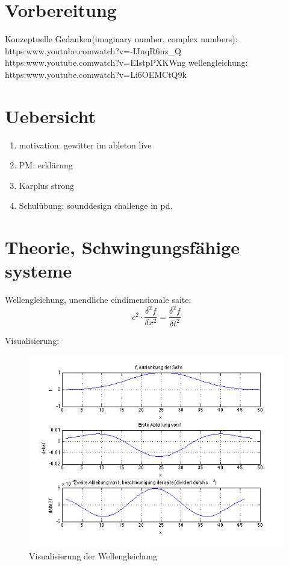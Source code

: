 \section{Vorbereitung}


Konzeptuelle Gedanken(imaginary number, complex numbers): \\
https:\/\/www.youtube.com\/watch?v=-IJuqR6nz\_Q \\
https:\/\/www.youtube.com\/watch?v=EIstpPXKWng
wellengleichung:\\
https:\/\/www.youtube.com\/watch?v=Li6OEMCtQ9k




\section{Uebersicht}


\begin{enumerate}
	\item motivation: gewitter im ableton live
	\item PM: erklärung
	\item Karplus strong 
	\item Schulübung: sounddesign challenge in pd.

\end{enumerate}

\section{Theorie, Schwingungsfähige systeme}


Wellengleichung, unendliche eindimensionale saite:
\begin{equation}
	c^2 \cdot \frac{\delta^2 f}{\delta x^2} = \frac{\delta ^2 f}{\delta t ^2}
\end{equation}

Visualisierung:

\begin{figure}[H]
  \begin{center}
    \includegraphics[width = 14cm]{img/wellengleichung.png}
    \caption{Visualisierung der Wellengleichung}
    \label{fig:wellengleichung}
  \end{center}
\end{figure}




